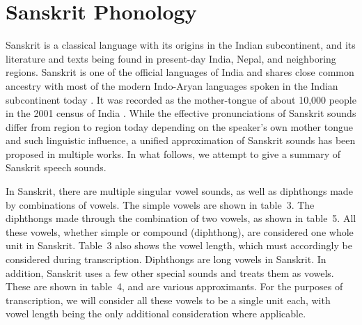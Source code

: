 \documentclass[10pt,a4paper]{article}
\begin{document}
\section{Sanskrit Phonology}

Sanskrit is a classical language with its origins in the Indian subcontinent, and its literature and texts being found in present-day India, Nepal, and neighboring regions.
Sanskrit is one of the official languages of India and shares close common ancestry with most of the modern Indo-Aryan languages spoken in the Indian subcontinent today \cite{emeneau1956india}. It was recorded as the mother-tongue of about 10,000 people in the 2001 census of India \cite{banthia2001census}. While the effective pronunciations of Sanskrit sounds differ from region to region today depending on the speaker's own mother tongue and such linguistic influence, a unified approximation of Sanskrit sounds has been proposed in multiple works. In what follows, we attempt to give a summary of Sanskrit speech sounds.

In Sanskrit, there are multiple singular vowel sounds, as well as diphthongs made by combinations of vowels. The simple vowels are shown in table~3. The diphthongs made through the combination of two vowels, as shown in table~5. All these vowels, whether simple or compound (diphthong), are considered one whole unit in Sanskrit. 
Table~3 also shows the vowel length, which must accordingly be considered during transcription. Diphthongs are long vowels in Sanskrit.
In addition, Sanskrit uses a few other special sounds and treats them as vowels. These are shown in table~4, and are various approximants. For the purposes of transcription, we will consider all these vowels to be a single unit each, with vowel length being the only additional consideration where applicable.

\end{document}
